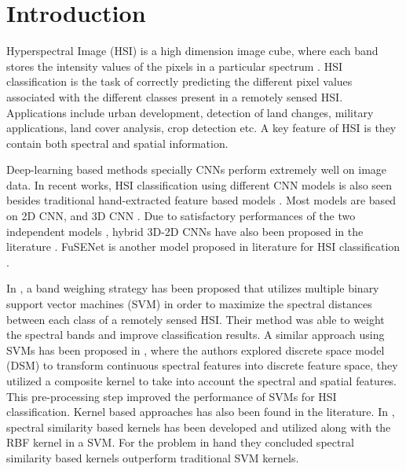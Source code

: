 \documentclass[journal]{IEEEtran}
\begin{document}
\IEEEpeerreviewmaketitle

\section{Introduction}
 Hyperspectral Image (HSI) is a high dimension image cube, where each band stores the intensity values of the pixels in a particular spectrum \cite{AMIGO20203}. HSI classification is the task of correctly predicting the different pixel values associated with the different classes present in a remotely sensed HSI. Applications include urban development, detection of land changes, military applications, land cover analysis, crop detection etc. A key feature of HSI is they contain both spectral and spatial information. 


Deep-learning based methods specially CNNs perform extremely well on image data. In recent works, HSI classification using different CNN models is also seen besides traditional hand-extracted feature based models \cite{8697135}. Most models are based on 2D CNN, and 3D CNN \cite{8340197}. Due to satisfactory performances of the two independent models \cite{9200676}, hybrid 3D-2D CNNs have also been proposed in the literature \cite{HAN202038}. FuSENet is another model proposed in literature for HSI classification \cite{iet:/content/journals/10.1049/iet-ipr.2019.1462}.

In \cite{7465721}, a band weighing strategy has been proposed that utilizes multiple binary support vector machines (SVM) in order to maximize the spectral distances between each class of a remotely sensed HSI. Their method was able to weight the spectral bands and improve classification results. A similar approach using SVMs has been proposed in \cite{7831354}, where the authors explored discrete space model (DSM) to transform continuous spectral features into discrete feature space, they utilized a composite kernel to take into account the spectral and spatial features. This pre-processing step improved the performance of SVMs for HSI classification. Kernel based approaches has also been found in the literature. In \cite{wang2020spectral}, spectral similarity based kernels has been developed and utilized along with the RBF kernel in a SVM. For the problem in hand they concluded spectral similarity based kernels outperform traditional SVM kernels. 
\end{document}
